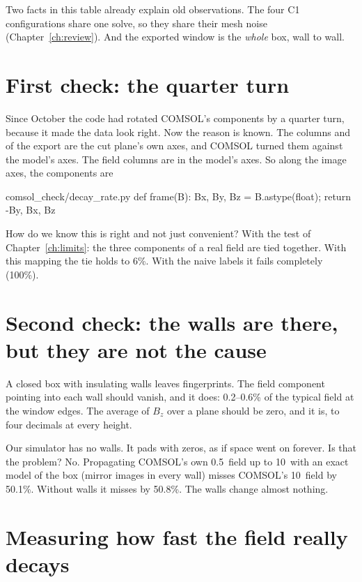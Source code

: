 Two facts in this table already explain old observations. The four C1 configurations share one solve, so they share
their mesh noise (Chapter~\ref{ch:review}). And the exported window is the \emph{whole} box, wall to wall.

\section{First check: the quarter turn}

Since October the code had rotated COMSOL's components by a quarter turn, because it made the data look right. Now the
reason is known. The columns  and  of the export are the cut plane's own axes, and COMSOL turned
them against the model's axes. The field columns are in the model's axes. So along the image axes, the components are

\begin{code*}{comsol_check/decay_rate.py}
def frame(B):
    Bx, By, Bz = B.astype(float); return -By, Bx, Bz
\end{code*}

How do we know this is right and not just convenient? With the test of Chapter~\ref{ch:limits}: the three components of
a real field are tied together. With this mapping the tie holds to 6\%. With the naive labels it fails completely
(100\%).

\section{Second check: the walls are there, but they are not the cause}

A closed box with insulating walls leaves fingerprints. The field component pointing into each wall should vanish,
and it does: 0.2--0.6\% of the typical field at the window edges. The average of $B_z$ over a plane should be zero, and
it is, to four decimals at every height.

Our simulator has no walls. It pads with zeros, as if space went on forever. Is that the problem? No. Propagating
COMSOL's own 0.5\um\ field up to 10\um\ with an exact model of the box (mirror images in every wall) misses COMSOL's
10\um\ field by 50.1\%. Without walls it misses by 50.8\%. The walls change almost nothing.

\section{Measuring how fast the field really decays}\label{sec:cm_decay}

